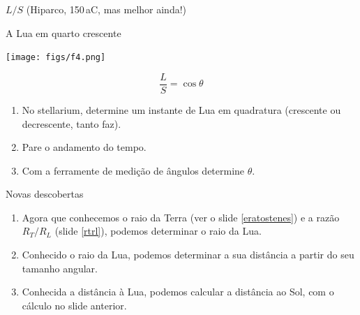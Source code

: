\documentclass[beamer,9pt,aspectratio=169]{beamer}
\begin{document}
\begin{frame}{$L/S$ (Hiparco, 150\,aC, mas melhor ainda!)}
  \begin{minipage}[t]{0.4\linewidth}
  \begin{center}
    A Lua em quarto crescente
    
    \vspace{2em}
    \texttt{[image: figs/f4.png]}
  \end{center}
  \pause
  \vspace{3em}
  \begin{equation*}
        \frac{L}{S}=\cos\theta
  \end{equation*}
  \end{minipage}
  \hfill
  \begin{minipage}[t]{0.4\linewidth}
    \pause
    \begin{enumerate}
      \setlength{\itemsep}{2em}
      \item No stellarium, determine um instante de Lua em quadratura (crescente
        ou decrescente, tanto faz).
      \item Pare o andamento do tempo.
      \item Com a ferramente de medição de ângulos determine $\theta$.
    \end{enumerate}
  \end{minipage}
\end{frame}
\begin{frame}{Novas descobertas}
  \begin{enumerate}
      \setlength{\itemsep}{3em}
    \item
      Agora que conhecemos o raio da Terra (ver o slide \ref{eratostenes})
      e a razão $R_T/R_L$ (slide \ref{rtrl}), podemos determinar o raio da Lua.
    \item Conhecido o raio da Lua, podemos determinar a sua distância a partir
      do seu tamanho angular.
    \item Conhecida a distância à Lua, podemos calcular a distância ao Sol, com o
      cálculo no slide anterior.
  \end{enumerate}
\end{frame}
\end{document}
